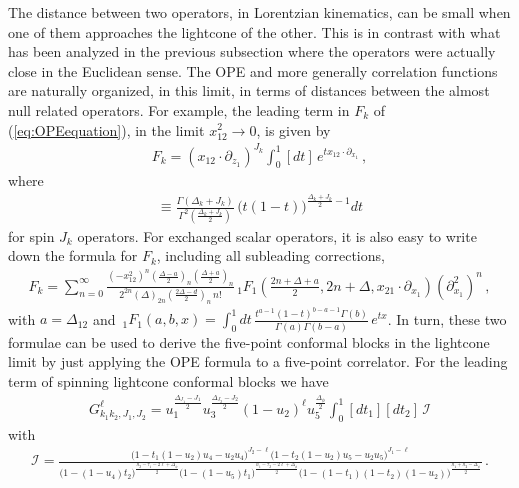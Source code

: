 The distance between two operators, in Lorentzian kinematics, can be small when one of them approaches the lightcone of the other.
This is in contrast with what has been analyzed in the previous subsection where the operators were actually close in the Euclidean sense.
The OPE and more generally correlation functions are naturally organized, in this limit, in terms of distances between the almost null related operators.
For example, the leading term in $F_k$ of (\ref{eq:OPEequation}), in the limit $x_{12}^2\rightarrow 0$, is given by
\begin{align}
  F_{k} = (x_{12}\cdot \partial_{z_1})^{J_k} \int_{0}^{1} [dt]  \, e^{tx_{12}\cdot \partial_{x_1} }\,,\label{eq:lightconeLeadingSpin}
\end{align}
where
\begin{align}
  [dt] \equiv \frac{\Gamma(\Delta_k+J_k)}{\Gamma^2(\frac{\Delta_k+J_k}{2})} \,\big(t(1-t)\big)^{\frac{\Delta_k+J_k}{2}-1}dt
\end{align}
for spin $J_k$ operators.
For exchanged scalar operators, it is also easy to write down the formula for $F_k$, including all subleading corrections,
\begin{align}
  F_{k} = \sum_{n=0}^{\infty} \frac{(-x_{12}^2)^{n} \left(\frac{\Delta-a}{2}\right)_n\left(\frac{\Delta+a}{2}\right)_n}{2^{2n} (\Delta)_{2n} (\tfrac{2\Delta-d}{2})_n\, n!} \,_1F_1\left(\frac{2n+\Delta+a}{2},2n+\Delta,x_{21}\cdot \partial_{x_1}\right) (\partial_{x_1}^2)^{n} \,,
  \label{eq:lightconeScalarAll}
\end{align}
with $a=\Delta_{12}$ and $\,_1F_1(a,b,x)=\int_{0}^{1}dt \, \tfrac{t^{a-1}(1-t)^{b-a-1}\Gamma(b)}{\Gamma(a)\Gamma(b-a)} \,e^{t x}$.
In turn, these two formulae can be used to derive the five-point conformal blocks in the lightcone limit by just applying the OPE formula to a five-point correlator. For the leading term of spinning lightcone conformal blocks we have
\begin{align}
  G_{k_1k_2,J_1,J_2}^{\ell} =u_1^{\frac{\Delta_{J_1}-J_1}{2}} u_3^{\frac{\Delta_{J_2}-J_2}{2}} (1-u_2)^{\ell}u_5^{\frac{\Delta_\phi}{2}}  \int_{0}^{1}[dt_1][dt_2] \, \mathcal{I}
  \label{eq:lightconeblocksspins}
\end{align}
with
\begin{align}
  \mathcal{I}=\tfrac{\big(1-t_1(1-u_2)u_4-u_2u_4\big)^{J_2-\ell}\big(1-t_2(1-u_2)u_5-u_2u_5\big)^{J_1-\ell}}{ \big(1-(1-u_4)t_2\big)^{\frac{h_2-\tau_1-2\ell+\Delta_\phi}{2}}\big(1-(1-u_5)t_1\big)^{\frac{h_1-\tau_2-2\ell+\Delta_\phi}{2}} \big(1-(1-t_1)(1-t_2)(1-u_2)\big)^{\frac{h_1+h_2-\Delta_\phi}{2}}}\,.
\end{align}

